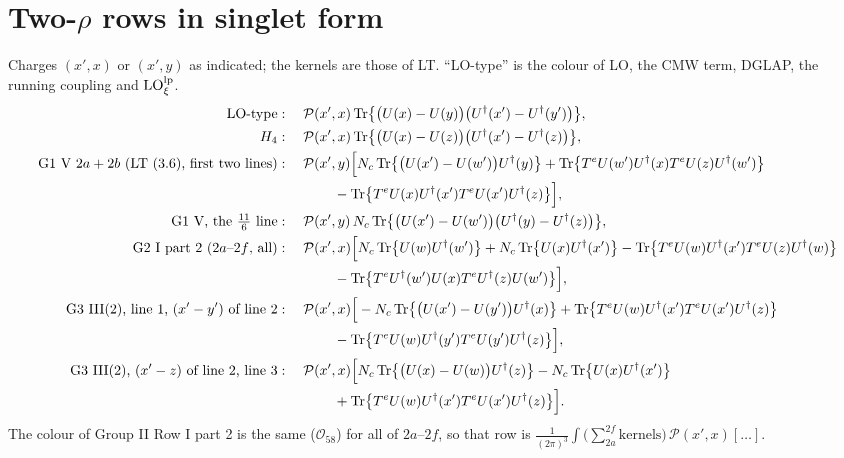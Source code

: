 \documentclass[10pt]{article}
\numberwithin{equation}{section}
\newcommand{\LO}{{\rm LO}}
\newcommand{\PP}{\mathcal P}
\newcommand{\Tr}{{\rm Tr}}
\newcommand{\Ud}{U^\dagger}
\newcommand{\OO}{\mathcal O}
\begin{document}
\section{Two-\texorpdfstring{$\rho$}{rho} rows in singlet form}\label{sec:two}
Charges $(x',x)$ or $(x',y)$ as indicated; the kernels are those of LT. ``LO-type'' is the colour of LO, the CMW term, DGLAP, the running coupling and $\LO^{\rm lp}_\xi$.
\begin{align}
\text{LO-type}&:\quad\PP(x',x)\,\Tr\big\{\big(U(x)-U(y)\big)\big(\Ud(x')-\Ud(y')\big)\big\},\label{eq:LO}\\
H_4&:\quad\PP(x',x)\,\Tr\big\{\big(U(x)-U(z)\big)\big(\Ud(x')-\Ud(z)\big)\big\},\\
\text{G1 V } 2a+2b\text{ (LT (3.6), first two lines)}&:\quad\PP(x',y)\Big[N_c\,\Tr\big\{\big(U(x')-U(w')\big)\Ud(y)\big\}+\Tr\big\{T^eU(w')\Ud(x)T^eU(z)\Ud(w')\big\}\notag\\
&\qquad\qquad-\Tr\big\{T^eU(x)\Ud(x')T^eU(x')\Ud(z)\big\}\Big],\\
\text{G1 V, the }\tfrac{11}{6}\text{ line}&:\quad\PP(x',y)\,N_c\,\Tr\big\{\big(U(x')-U(w')\big)\big(\Ud(y)-\Ud(z)\big)\big\},\\
\text{G2 I part 2 ($2a$--$2f$, all)}&:\quad\PP(x',x)\Big[N_c\,\Tr\big\{U(w)\Ud(w')\big\}+N_c\,\Tr\big\{U(x)\Ud(x')\big\}-\Tr\big\{T^eU(w)\Ud(x')T^eU(z)\Ud(w)\big\}\notag\\
&\qquad\qquad-\Tr\big\{T^e\Ud(w')U(x)T^e\Ud(z)U(w')\big\}\Big],\\
\text{G3 III(2), line 1, }(x'-y')\text{ of line 2}&:\quad\PP(x',x)\Big[-N_c\,\Tr\big\{\big(U(x')-U(y')\big)\Ud(x)\big\}+\Tr\big\{T^eU(w)\Ud(x')T^eU(x')\Ud(z)\big\}\notag\\
&\qquad\qquad-\Tr\big\{T^eU(w)\Ud(y')T^eU(y')\Ud(z)\big\}\Big],\\
\text{G3 III(2), }(x'-z)\text{ of line 2, line 3}&:\quad\PP(x',x)\Big[N_c\,\Tr\big\{\big(U(x)-U(w)\big)\Ud(z)\big\}-N_c\,\Tr\big\{U(x)\Ud(x')\big\}\notag\\
&\qquad\qquad+\Tr\big\{T^eU(w)\Ud(x')T^eU(x')\Ud(z)\big\}\Big].
\end{align}
The colour of Group II Row I part 2 is the same ($\OO_{58}$) for all of $2a$--$2f$, so that row is $\frac{1}{(2\pi)^3}\int\big(\sum_{2a}^{2f}\text{kernels}\big)\,\PP(x',x)[\dots]$.
\end{document}
